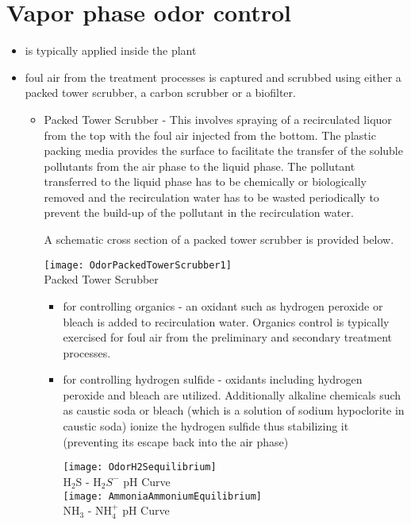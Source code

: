 \section{Vapor phase odor control}
\begin{itemize}
	\item is typically applied inside the plant
	\item foul air from the treatment processes is captured and scrubbed using either a packed tower scrubber, a carbon scrubber or a biofilter.
	\begin{itemize}
		\item Packed Tower Scrubber - This involves spraying of a recirculated liquor from the top with the foul air injected from the bottom.  The plastic packing media provides the surface to facilitate the transfer of the soluble pollutants from the air phase to the liquid phase.  The pollutant transferred to the liquid phase has to be chemically or biologically removed and the recirculation water has to be wasted periodically to prevent the build-up of the pollutant in the recirculation water.

A schematic cross section of a packed tower scrubber is provided below.

\begin{center}
\texttt{[image: OdorPackedTowerScrubber1]}\\
Packed Tower Scrubber
\end{center}
		\begin{itemize}
			\item for controlling organics - an oxidant such as hydrogen peroxide or bleach is added to recirculation water.  Organics control is typically exercised for foul air from the preliminary and secondary treatment processes.
			\item for controlling hydrogen sulfide - oxidants including hydrogen peroxide and bleach are utilized.  Additionally alkaline chemicals such as caustic soda or bleach (which is a solution of sodium hypoclorite in caustic soda) ionize the hydrogen sulfide thus stabilizing it (preventing its escape back into the air phase)


\begin{center}
\texttt{[image: OdorH2Sequilibrium]}\\
H$_2$S - H$_2S^-$ pH Curve\\
\texttt{[image: AmmoniaAmmoniumEquilibrium]}\\
 NH$_3$ - NH$_4^+$ pH Curve\\
 \end{center}


\end{itemize}
\end{itemize}
\end{itemize}
